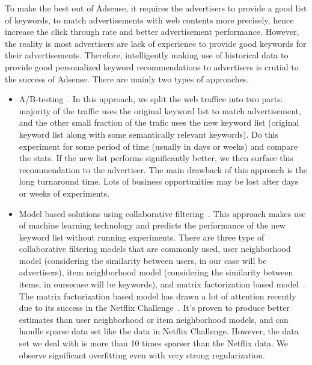 To make the best out of Adsense, it requires the advertisers to
provide a good list of keywords, to match advertisements with web
contents more precisely, hence increase the click through rate and
better advertisement performance. However, the reality is most
advertisers are lack of experience to provide good keywords for their
advertisements. Therefore, intelligently making use of historical data
to provide good personalized keyword recommendations to advertisers is
crutial to the success of Adsense. There are mainly two types of
approaches.
\begin{itemize}
\item A/B-testing~\cite{abtest:wiki}. In this approach, we split the
  web traffice into two parts: majority of the traffic uses the
  original keyword list to match advertisement, and the other small
  fraction of the trafic uses the new keyword list (original keyword
  list along with some semantically relevant keywords). Do this
  experiment for some period of time (usually in days or weeks) and
  compare the stats. If the new list performs significantly better, we
  then surface this recommendation to the advertiser. The main
  drawback of this approach is the long turnaround time. Lots of
  business opportunities may be lost after days or weeks of
  experiments.
\item Model based solutions using collaborative
  filtering~\cite{resnick1997recommender,sarwar2001item}. This
  approach makes use of machine learning technology and predicts the
  performance of the new keyword list without running
  experiments. There are three type of collaborative filtering models
  that are commonly used, user neighborhood model (considering the
  similarity between users, in our case will be advertisers), item
  neighborhood model (considering the similarity between items, in
  oursecase will be keywords), and matrix factorization based
  model~\cite{}. The matrix factorization based model has drawn a lot
  of attention recently due to its success in the Netflix
  Challenge~\cite{}. It's proven to produce better estimates than user
  neighborhood or item neighborhood models, and can handle sparse data
  set like the data in Netflix Challenge. However, the data set we
  deal with is more than 10 times sparser than the Netflix data. We
  observe significant overfitting even with very strong
  regularization.
\end{itemize}

